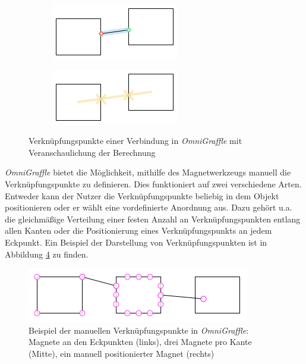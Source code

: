 \begin{figure}[hbt]
    \newcommand{\subfigurewidth}{0.5\textwidth}
    \newcommand{\graphicswidth}{0.8\linewidth}
    \begin{subfigure}{\subfigurewidth}
        \centering
        \includegraphics[width=\graphicswidth]{assets/omnigraffle-connection-points-a}
        \caption{}
        \label{fig:omnigraffle-connection-points-a}
    \end{subfigure}
    \begin{subfigure}{\subfigurewidth}
        \centering
        \includegraphics[width=\graphicswidth]{assets/omnigraffle-connection-points-b}
        \caption{}
        \label{fig:omnigraffle-connection-points-b}
    \end{subfigure}
    \caption{Verknüpfungspunkte einer Verbindung in \textit{OmniGraffle}  mit Veranschaulichung der Berechnung }
    \label{fig:omnigraffle-connection-points}
\end{figure}

\textit{OmniGraffle} bietet die Möglichkeit, mithilfe des Magnetwerkzeugs manuell die Verknüpfungspunkte zu definieren. Dies funktioniert auf zwei verschiedene Arten. Entweder kann der Nutzer die Verknüpfungspunkte beliebig in dem Objekt positionieren oder er wählt eine vordefinierte Anordnung aus. Dazu gehört u.a. die gleichmäßige Verteilung einer festen Anzahl an Verknüpfungspunkten entlang allen Kanten oder die Positionierung eines Verknüpfungspunkts an jedem Eckpunkt. Ein Beispiel der Darstellung von Verknüpfungspunkten ist in Abbildung \ref{fig:omnigraffle-magnets-example} zu finden.

\begin{figure}[hbt]
    \centering
    \includegraphics{assets/omnigraffle-magnets-example.png}
    \caption{Beispiel der manuellen Verknüpfungspunkte in \textit{OmniGraffle}: Magnete an den Eckpunkten (links), drei Magnete pro Kante (Mitte), ein manuell positionierter Magnet (rechts)}
    \label{fig:omnigraffle-magnets-example}
\end{figure}


